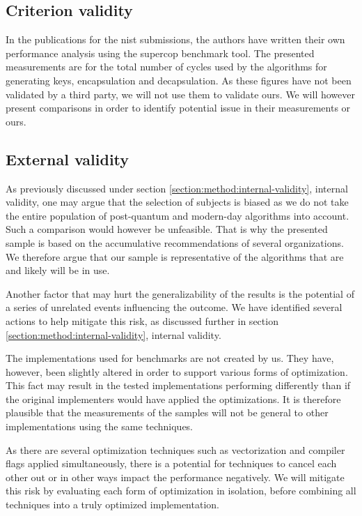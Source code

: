 \subsection{Criterion validity}
In the publications for the \gls{nist} submissions, the authors have written their own performance analysis using the \gls{supercop} benchmark tool. The presented measurements are for the total number of cycles used by the algorithms for generating keys, encapsulation and decapsulation. As these figures have not been validated by a third party, we will not use them to validate ours. We will however present comparisons in order to identify potential issue in their measurements or ours.

\subsection{External validity}

As previously discussed under section \ref{section:method:internal-validity}, internal validity, one may argue that the selection of subjects is biased as we do not take the entire population of post-quantum and modern-day algorithms into account. Such a comparison would however be unfeasible. That is why the presented sample is based on the accumulative recommendations of several organizations. We therefore argue that our sample is representative of the algorithms that are and likely will be in use.

Another factor that may hurt the generalizability of the results is the potential of a series of unrelated events influencing the outcome. We have identified several actions to help mitigate this risk, as discussed further in section \ref{section:method:internal-validity}, internal validity.

The implementations used for benchmarks are not created by us. They have, however, been slightly altered in order to support various forms of optimization. This fact may result in the tested implementations performing differently than if the original implementers would have applied the optimizations. It is therefore plausible that the measurements of the samples will not be general to other implementations using the same techniques.

As there are several optimization techniques such as vectorization and compiler flags applied simultaneously, there is a potential for techniques to cancel each other out or in other ways impact the performance negatively. We will mitigate this risk by evaluating each form of optimization in isolation, before combining all techniques into a truly optimized implementation.


